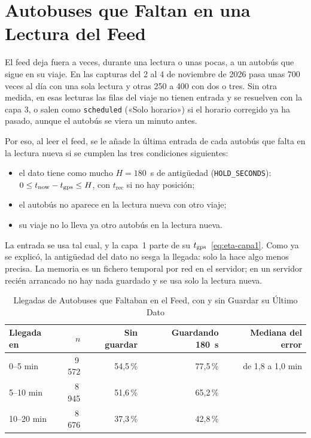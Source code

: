 \section{Autobuses que Faltan en una Lectura del Feed}
\label{sec:memoria-feed}

El feed deja fuera a veces, durante una lectura o unas pocas, a un autobús que sigue en su viaje. En las capturas del 2
al 4 de noviembre de 2026 pasa unas 700 veces al día con una sola lectura y otras 250 a 400 con dos o tres. Sin otra
medida, en esas lecturas las filas del viaje no tienen entrada y se resuelven con la capa 3, o salen como
\texttt{scheduled} («Solo horario») si el horario corregido ya ha pasado, aunque el autobús se viera un minuto antes.

Por eso, al leer el feed, se le añade la última entrada de cada autobús que falta en la lectura nueva si se cumplen
las tres condiciones siguientes:
\begin{itemize}
  \item el dato tiene como mucho $H=180$~s de antigüedad (\texttt{HOLD\_SECONDS}): $0\le t_{\mathrm{now}}-t_{\mathrm{gps}}\le H$, con
        $t_{\mathrm{rec}}$ si no hay posición;
  \item el autobús no aparece en la lectura nueva con otro viaje;
  \item su viaje no lo lleva ya otro autobús en la lectura nueva.
\end{itemize}
La entrada se usa tal cual, y la capa~1 parte de su $t_{\mathrm{gps}}$~\eqref{eq:eta-capa1}. Como ya se explicó, la antigüedad del
dato no sesga la llegada: solo la hace algo menos precisa. La memoria es un fichero temporal por red en el servidor;
en un servidor recién arrancado no hay nada guardado y se usa solo la lectura nueva.

\begin{table}[ht]
\centering
\caption{Llegadas de Autobuses que Faltaban en el Feed, con y sin Guardar su Último Dato}\label{tab:memoria-feed}
\begin{tabular}{@{}lrrrr@{}}
\toprule
Llegada en & $n$ & Sin guardar & Guardando 180~s & Mediana del error\\
\midrule
0--5 min & 9\,572 & 54{,}5\,\% & 77{,}5\,\% & de 1{,}8 a 1{,}0 min\\
5--10 min & 8\,945 & 51{,}6\,\% & 65{,}2\,\% & \\
10--20 min & 8\,676 & 37{,}3\,\% & 42{,}8\,\% & \\
\bottomrule
\end{tabular}
\end{table}

